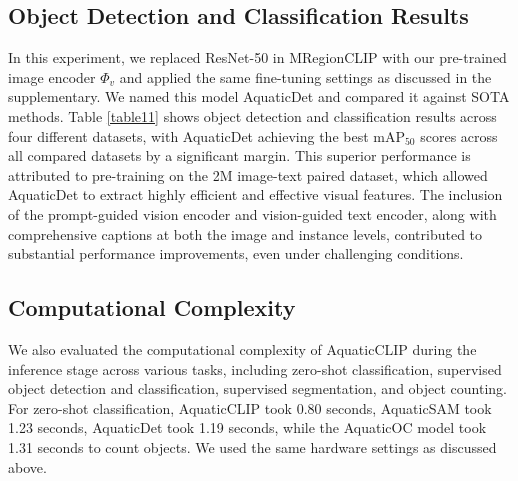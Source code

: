 \subsection{Object Detection and Classification Results}
In this experiment, we replaced ResNet-50 in MRegionCLIP with our pre-trained image encoder $\Phi_{v}$ and applied the same fine-tuning settings as discussed in the supplementary. 
We named this model AquaticDet and compared it against SOTA methods.
Table \ref{table11} shows object detection and classification results across four different datasets, with AquaticDet achieving the best mAP$_{50}$ scores across all compared datasets by a significant margin. 
This superior performance is attributed to pre-training on the 2M image-text paired dataset, which allowed AquaticDet to extract highly efficient and effective visual features. The inclusion of the prompt-guided vision encoder and vision-guided text encoder, along with comprehensive captions at both the image and instance levels, contributed to substantial performance improvements, even under challenging conditions.




\subsection{Computational Complexity}
We also evaluated the computational complexity of AquaticCLIP during the inference stage across various tasks, including zero-shot classification, supervised object detection and classification, supervised segmentation, and object counting. 
For zero-shot classification, AquaticCLIP took 0.80 seconds, AquaticSAM took 1.23 seconds, AquaticDet took 1.19 seconds, while the AquaticOC model took 1.31 seconds to count objects.
We used the same hardware settings as discussed above.



